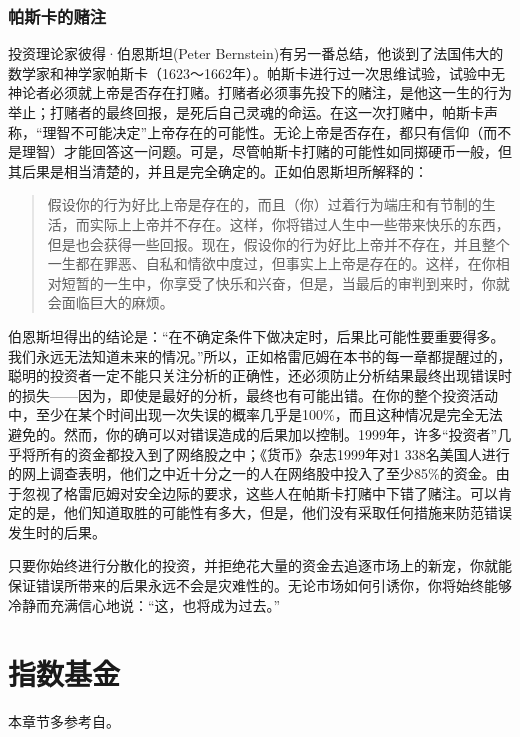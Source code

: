 \documentclass[12pt,oneside]{book}
\begin{document}
\subsection{帕斯卡的赌注}
投资理论家彼得·伯恩斯坦(Peter Bernstein)有另一番总结，他谈到了法国伟大的数学家和神学家帕斯卡（1623～1662年）。帕斯卡进行过一次思维试验，试验中无神论者必须就上帝是否存在打赌。打赌者必须事先投下的赌注，是他这一生的行为举止；打赌者的最终回报，是死后自己灵魂的命运。在这一次打赌中，帕斯卡声称，“理智不可能决定”上帝存在的可能性。无论上帝是否存在，都只有信仰（而不是理智）才能回答这一问题。可是，尽管帕斯卡打赌的可能性如同掷硬币一般，但其后果是相当清楚的，并且是完全确定的。正如伯恩斯坦所解释的：

\begin{quote}
假设你的行为好比上帝是存在的，而且（你）过着行为端庄和有节制的生活，而实际上上帝并不存在。这样，你将错过人生中一些带来快乐的东西，但是也会获得一些回报。现在，假设你的行为好比上帝并不存在，并且整个一生都在罪恶、自私和情欲中度过，但事实上上帝是存在的。这样，在你相对短暂的一生中，你享受了快乐和兴奋，但是，当最后的审判到来时，你就会面临巨大的麻烦。
\end{quote}

伯恩斯坦得出的结论是：“在不确定条件下做决定时，后果比可能性要重要得多。我们永远无法知道未来的情况。”所以，正如格雷厄姆在本书的每一章都提醒过的，聪明的投资者一定不能只关注分析的正确性，还必须防止分析结果最终出现错误时的损失——因为，即使是最好的分析，最终也有可能出错。在你的整个投资活动中，至少在某个时间出现一次失误的概率几乎是100\%，而且这种情况是完全无法避免的。然而，你的确可以对错误造成的后果加以控制。1999年，许多“投资者”几乎将所有的资金都投入到了网络股之中；《货币》杂志1999年对1 338名美国人进行的网上调查表明，他们之中近十分之一的人在网络股中投入了至少85\%的资金。由于忽视了格雷厄姆对安全边际的要求，这些人在帕斯卡打赌中下错了赌注。可以肯定的是，他们知道取胜的可能性有多大，但是，他们没有采取任何措施来防范错误发生时的后果。

只要你始终进行分散化的投资，并拒绝花大量的资金去追逐市场上的新宠，你就能保证错误所带来的后果永远不会是灾难性的。无论市场如何引诱你，你将始终能够冷静而充满信心地说：“这，也将成为过去。”







\chapter{指数基金}
本章节多参考自\cite{指数基金投资从入门到精通}。
\end{document}
